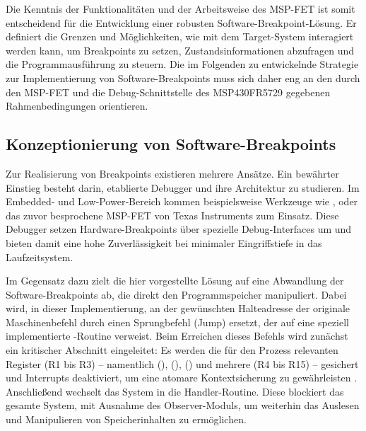 Die Kenntnis der Funktionalit\"aten und der Arbeitsweise des MSP-FET ist somit entscheidend f\"ur die Entwicklung einer robusten Software-Breakpoint-L\"osung. Er definiert die Grenzen und M\"oglichkeiten, wie mit dem Target-System interagiert werden kann, um Breakpoints zu setzen, Zustandsinformationen abzufragen und die Programmausf\"uhrung zu steuern. Die im Folgenden zu entwickelnde Strategie zur Implementierung von Software-Breakpoints muss sich daher eng an den durch den MSP-FET und die Debug-Schnittstelle des MSP430FR5729 gegebenen Rahmenbedingungen orientieren.


\newpage
\subsection{Konzeptionierung von Software-Breakpoints}
\label{sec:KonzeptionierungSoftwareBreakpoints}

Zur Realisierung von Breakpoints existieren mehrere Ans\"atze. Ein bew\"ahrter Einstieg besteht darin, etablierte Debugger und ihre Architektur zu studieren. Im Embedded‑ und Low‑Power‑Bereich kommen beispielsweise Werkzeuge wie ,  oder das zuvor besprochene MSP-FET von Texas Instruments zum Einsatz. Diese Debugger setzen Hardware-Breakpoints \"uber spezielle Debug‑Interfaces um und bieten damit eine hohe Zuverl\"assigkeit bei minimaler Eingriffstiefe in das Laufzeitsystem.

Im Gegensatz dazu zielt die hier vorgestellte L\"osung auf eine Abwandlung der Software-Breakpoints ab, die direkt den Programmspeicher manipuliert. Dabei wird, in dieser Implementierung, an der gew\"unschten Halteadresse der originale Maschinenbefehl durch einen Sprungbefehl (Jump) ersetzt, der auf eine speziell implementierte -Routine verweist. Beim Erreichen dieses Befehls wird zun\"achst ein kritischer Abschnitt eingeleitet: Es werden die f\"ur den Prozess relevanten Register (R1 bis R3) – namentlich  (),  (),  () und \ggf mehrere  (R4 bis R15) – gesichert und Interrupts deaktiviert, um eine atomare Kontextsicherung zu gew\"ahrleisten . Anschlie{\ss}end wechselt das System in die Handler-Routine. Diese blockiert das gesamte System, mit Ausnahme des Observer-Moduls, um weiterhin das Auslesen und Manipulieren von Speicherinhalten zu erm\"oglichen.

